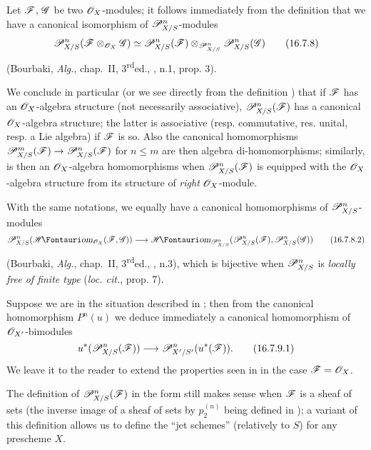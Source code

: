 \begin{env}[16.7.8]
\label{IV.16.7.8}
Let $\mathscr{F}$, $\mathscr{G}$ be two $\mathscr{O}_X$-modules;
it follows immediately from the definition  that we have a canonical isomorphism of $\mathscr{P}_{X/S}^n$-modules
\[
  \label{IV.16.7.8}
  \mathscr{P}_{X/S}^n(\mathscr{F} \otimes_{\mathscr{O}_X} \mathscr{G}) \simeq \mathscr{P}_{X/S}^n(\mathscr{F}) \otimes_{\mathscr{P}_{X/S}^n} \mathscr{P}_{X/S}^n(\mathscr{G})
  \tag{16.7.8}
\]
(Bourbaki, \emph{Alg.}, chap.~II, 3\textsuperscript{rd}ed., , n.1, prop. 3).

We conclude in particular (or we see directly from the definition ) that if $\mathscr{F}$ has an $\mathscr{O}_X$-algebra structure (not necessarily associative), $\mathscr{P}_{X/S}^n(\mathscr{F})$ has a canonical $\mathscr{O}_X$-algebra structure;
the latter is associative (resp. commutative, res. unital, resp. a Lie algebra) if $\mathscr{F}$ is so.
Also the canonical homomorphisms $\sh{P}_{X/S}^m(\sh{F}) \to \sh{P}_{X/S}^n(\sh{F})$ for $n \leq m$  are then algebra di-homomorphisms;
similarly,  is then an $\mathscr{O}_X$-algebra homomorphisms when $\mathscr{P}_{X/S}^n(\mathscr{F})$ is equipped with the $\mathscr{O}_X$-algebra structure from its structure of \emph{right} $\mathscr{O}_X$-module.

With the same notations, we equally have a canonical homomorphisms of $\mathscr{P}_{X/S}^n$-modules
\[
  \label{IV.16.7.8.2}
  \sh{P}_{X/S}^n(\shHom_{\sh{O}_X}(\sh{F}, \sh{G})) \to \shHom_{\sh{P}_{X/S}^n}(\sh{P}_{X/S}^n(\sh{F}), \sh{P}_{X/S}^n(\sh{G}))
  \tag{16.7.8.2}
\]
(Bourbaki, \emph{Alg.}, chap.~II, 3\textsuperscript{rd}ed., , n.3), which is bijective when $\mathscr{P}_{X/S}^n$ is \emph{locally free of finite type} (\emph{loc. cit.}, prop. 7).
\end{env}

\begin{env}[16.7.9]
\label{IV.16.7.9}
Suppose we are in the situation described in ;
then from the canonical homomorphism $P^n(u)$  we deduce immediately a canonical homomorphism of $\mathscr{O}_{X'}$-bimodules 
\[
  \label{IV.16.7.9.1}
  u^*(\sh{P}_{X/S}^n(\sh{F})) \to \sh{P}_{X'/S'}^n(u^*(\sh{F})).
  \tag{16.7.9.1}
\]
We leave it to the reader to extend the properties seen in  in the case $\mathscr{F} = \mathscr{O}_X$.
\end{env}

\begin{remark}[16.7.10]
\label{IV.16.7.10}
The definition of $\mathscr{P}_{X/S}^n(\mathscr{F})$ in the form  still makes sense when $\mathscr{F}$ is a sheaf of sets (the inverse image of a sheaf of sets by $p_2^{(n)}$ being defined in );
a variant of this definition allows us to define the ``jet schemes'' (relatively to $S$) for any prescheme $X$.
\end{remark}


